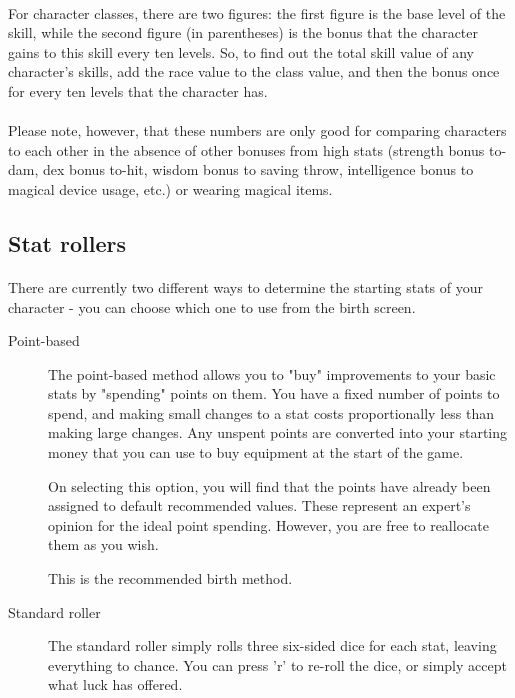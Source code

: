 \paragraph{}
For character classes, there are two figures: the first figure is the
base level of the skill, while the second figure (in parentheses) is
the bonus that the character gains to this skill every ten levels. So,
to find out the total skill value of any character's skills, add the
race value to the class value, and then the bonus once for every ten
levels that the character has.

\paragraph{}
Please note, however, that these numbers are only good for comparing
characters to each other in the absence of other bonuses from high stats
(strength bonus to-dam, dex bonus to-hit, wisdom bonus to saving throw,
intelligence bonus to magical device usage, etc.) or wearing magical
items.


\subsection{Stat rollers}
\paragraph{}
There are currently two different ways to determine the starting stats of
your character - you can choose which one to use from the birth screen.
\begin{description}
\item[Point-based] The point-based method allows you to "buy"
    improvements to your basic stats by "spending" points on them. You
    have a fixed number of points to spend, and making small changes to
    a stat costs proportionally less than making large changes.  Any
    unspent points are converted into your starting money that you can
    use to buy equipment at the start of the game.

    On selecting this option, you will find that the points have
    already been assigned to default recommended values. These
    represent an expert's opinion for the ideal point spending.
    However, you are free to reallocate them as you wish.

    This is the recommended birth method.

\item[Standard roller] The standard roller simply rolls three six-sided dice for each
    stat, leaving everything to chance. You can press 'r' to re-roll
    the dice, or simply accept what luck has offered.
\end{description}

